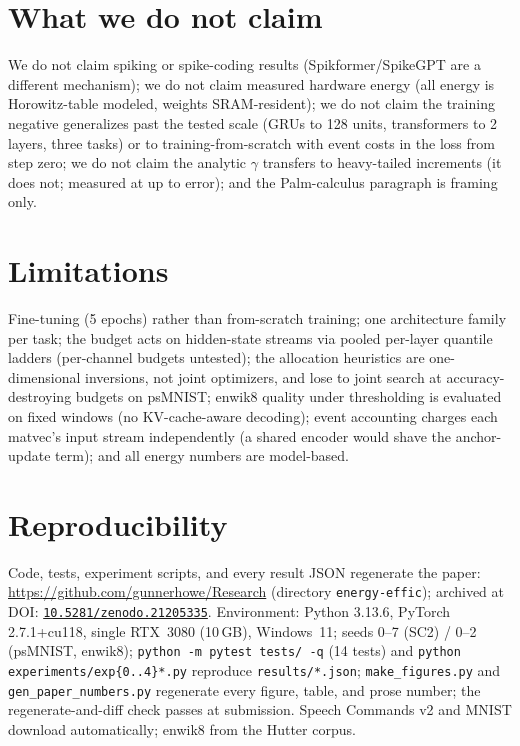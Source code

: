 \documentclass[10pt]{article}
\begin{document}
\section{What we do not claim}
We do not claim spiking or spike-coding results (Spikformer/SpikeGPT are a
different mechanism); we do not claim measured hardware energy (all energy
is Horowitz-table modeled, weights SRAM-resident); we do not claim the
training negative generalizes past the tested scale (GRUs to 128 units,
transformers to 2 layers, three tasks) or to training-from-scratch with
event costs in the loss from step zero; we do not claim the analytic
$\gamma$ transfers to heavy-tailed increments (it does not; measured at up
to \AnalyticGammaWorstSCTwo{} error); and the Palm-calculus paragraph is
framing only.

\section{Limitations}
Fine-tuning (5 epochs) rather than from-scratch training; one architecture
family per task; the budget acts on hidden-state streams via pooled
per-layer quantile ladders (per-channel budgets untested); the allocation
heuristics are one-dimensional inversions, not joint optimizers, and lose
to joint search at accuracy-destroying budgets on psMNIST; enwik8 quality
under thresholding is evaluated on fixed windows (no KV-cache-aware
decoding); event accounting charges each matvec's input stream
independently (a shared encoder would shave the anchor-update term); and
all energy numbers are model-based.

\section{Reproducibility}
Code, tests, experiment scripts, and every result JSON regenerate the
paper: \url{https://github.com/gunnerhowe/Research} (directory
\texttt{energy-effic}); archived at DOI:
\href{https://doi.org/10.5281/zenodo.21205335}{\texttt{10.5281/zenodo.21205335}}.
Environment: Python 3.13.6, PyTorch
2.7.1+cu118, single RTX~3080 (10\,GB), Windows~11; seeds 0--7 (SC2) / 0--2
(psMNIST, enwik8); \texttt{python -m pytest tests/ -q} (14 tests) and
\texttt{python experiments/exp\{0..4\}*.py} reproduce
\texttt{results/*.json}; \texttt{make\_figures.py} and
\texttt{gen\_paper\_numbers.py} regenerate every figure, table, and prose
number; the regenerate-and-diff check passes at submission. Speech
Commands v2 and MNIST download automatically; enwik8 from the Hutter
corpus.
\end{document}
